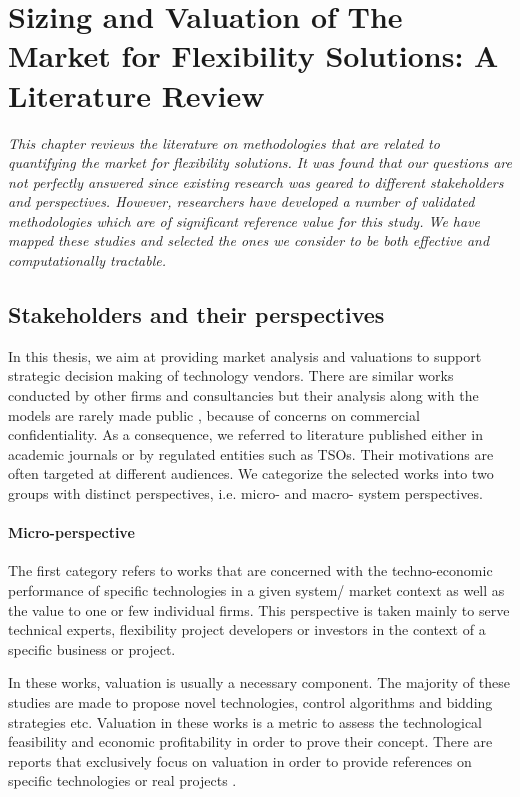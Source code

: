 \chapter{Sizing and Valuation of The Market for Flexibility Solutions: A Literature Review}
\label{ch:LitRev}
\textit{This chapter reviews the literature on methodologies that are related to quantifying the market for flexibility solutions. It was found that our questions are not perfectly answered since existing research was geared to different stakeholders and perspectives. However, researchers have developed a number of validated methodologies which are of significant reference value for this study. We have mapped these studies and selected the ones we consider to be both effective and computationally tractable.}

\section{Stakeholders and their perspectives}

In this thesis, we aim at providing market analysis and valuations to support strategic decision making of technology vendors. There are similar works conducted by other firms and consultancies but their analysis along with the models are rarely made public \cite{Zucker2013}, because of concerns on commercial confidentiality. As a consequence, we referred to literature published either in academic journals or by regulated entities such as TSOs. Their motivations are often targeted at different audiences. We categorize the selected works into two groups with distinct perspectives, i.e. micro- and macro- system perspectives.

\subsubsection{Micro-perspective}

The first category refers to works that are concerned with the techno-economic performance of specific technologies in a given system/ market context as well as the value to one or few individual firms. This perspective is taken mainly to serve technical experts, flexibility project developers or investors in the context of a specific business or project.

In these works, valuation is usually a necessary component. The majority of these studies are made to propose novel technologies, control algorithms and bidding strategies etc. Valuation in these works is a metric to assess the technological feasibility and economic profitability in order to prove their concept. There are reports that exclusively focus on valuation in order to provide references on specific technologies or real projects \cite{Mokrian2006,Walawalkar2007,Sioshansi2009,Byrne2012,Berrada2016,Salles2017}.

